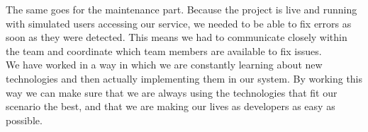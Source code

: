 The same goes for the maintenance part. Because the project is live and running with simulated users accessing our service, we needed to be able to fix errors as soon as they were detected. This means we had to communicate closely within the team and coordinate which team members are available to fix issues.\\

We have worked in a way in which we are constantly learning about new technologies and then actually implementing them in our system. By working this way we can make sure that we are always using the technologies that fit our scenario the best, and that we are making our lives as developers as easy as possible.